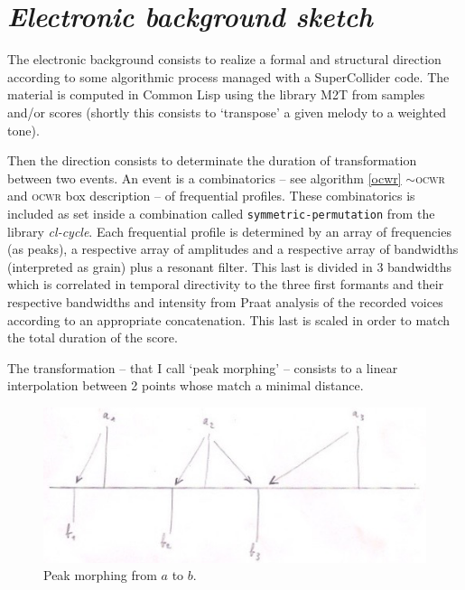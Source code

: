 \clearpage

\section{\textsl{Electronic background sketch}}
\label{imp1}

\bigskip

The electronic background consists to realize a formal and structural direction according to some algorithmic process managed with a SuperCollider code. The material is computed in Common Lisp using the library M2T from samples and/or scores (shortly this consists to `transpose' a given melody to a weighted tone).

Then the direction consists to determinate the duration of transformation between two events. An event is a combinatorics %
 -- see  algorithm \ref{ocwr} $\sim$\textsc{ocwr} and \textsc{ocwr} box description -- of frequential profiles. These combinatorics is included as set inside a combination called \texttt{symmetric-permutation} from the library \textsl{cl-cycle}. Each frequential profile is determined by an array of frequencies (as peaks), a respective array of amplitudes and a respective array of bandwidths (interpreted as grain) plus a resonant filter. This last is divided in 3 bandwidths which is correlated in temporal directivity to the three first formants and their respective bandwidths and intensity from Praat analysis of the recorded voices according to an appropriate concatenation. This last is scaled in order to match the total duration of the score.

\bigskip

The transformation --  that I call `peak morphing' -- consists to a linear interpolation between 2 points whose match a minimal distance.

\begin{figure}[h]
\begin{center}
\includegraphics[scale=0.6]{img/9873}
\caption{Peak morphing from $a$ to $b$.}
\label{a1}
\end{center}
\end{figure}

